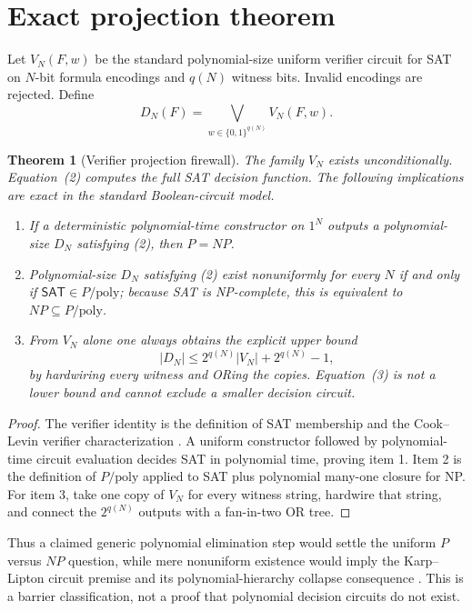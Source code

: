 \documentclass[11pt]{article}
\newtheorem{theorem}{Theorem}
\newcommand{\SAT}{\mathsf{SAT}}
\begin{document}
\section{Exact projection theorem}
Let $V_N(F,w)$ be the standard polynomial-size uniform verifier circuit for
SAT on $N$-bit formula encodings and $q(N)$ witness bits.  Invalid encodings
are rejected.  Define
\[
 D_N(F)=\bigvee_{w\in\{0,1\}^{q(N)}}V_N(F,w).                       \tag{2}
\]

\begin{theorem}[Verifier projection firewall]
The family $V_N$ exists unconditionally.  Equation~(2) computes the full SAT
decision function.  The following implications are exact in the standard
Boolean-circuit model.
\begin{enumerate}
\item If a deterministic polynomial-time constructor on $1^N$ outputs a
polynomial-size $D_N$ satisfying (2), then $P=NP$.
\item Polynomial-size $D_N$ satisfying (2) exist nonuniformly for every $N$
if and only if $\SAT\in P/\mathrm{poly}$; because SAT is NP-complete, this is
equivalent to $NP\subseteq P/\mathrm{poly}$.
\item From $V_N$ alone one always obtains the explicit upper bound
\[
 |D_N|\le 2^{q(N)}|V_N|+2^{q(N)}-1,                                \tag{3}
\]
by hardwiring every witness and ORing the copies.  Equation~(3) is not a
lower bound and cannot exclude a smaller decision circuit.
\end{enumerate}
\end{theorem}
\begin{proof}
The verifier identity is the definition of SAT membership and the
Cook--Levin verifier characterization \cite{cook1971}.  A uniform constructor
followed by polynomial-time circuit evaluation decides SAT in polynomial
time, proving item 1.  Item 2 is the definition of $P/\mathrm{poly}$ applied
to SAT plus polynomial many-one closure for NP.  For item 3, take one copy of
$V_N$ for every witness string, hardwire that string, and connect the
$2^{q(N)}$ outputs with a fan-in-two OR tree.
\end{proof}

Thus a claimed generic polynomial elimination step would settle the uniform
$P$ versus $NP$ question, while mere nonuniform existence would imply the
Karp--Lipton circuit premise and its polynomial-hierarchy collapse
consequence \cite{karplipton1980}.  This is a barrier classification, not a
proof that polynomial decision circuits do not exist.
\end{document}
